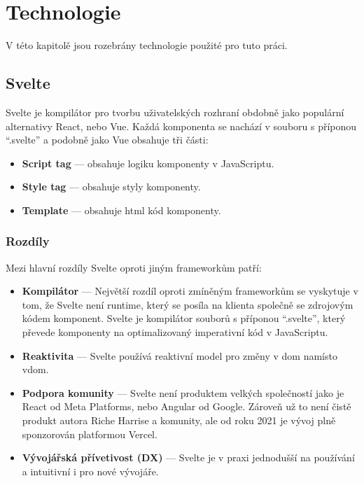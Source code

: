 \chapter{Technologie}

V této kapitolě jsou rozebrány technologie použité pro tuto práci.

\section{Svelte}\label{sec:Svelte}

Svelte je kompilátor pro tvorbu uživatelských rozhraní obdobně jako populární alternativy React, nebo Vue.
Každá komponenta se nachází v souboru s příponou ``.svelte'' a podobně jako Vue obsahuje tři části:

\begin{itemize}
    \item \textbf{Script tag} --- obsahuje logiku komponenty v JavaScriptu.
    \item \textbf{Style tag} --- obsahuje styly komponenty.
    \item \textbf{Template} --- obsahuje html kód komponenty.
\end{itemize}

\subsection{Rozdíly}

Mezi hlavní rozdíly Svelte oproti jiným frameworkům patří:

\begin{itemize}
    \item \textbf{Kompilátor} --- Největší rozdíl oproti zmíněným frameworkům se vyskytuje v tom, že Svelte není runtime, který se posíla na klienta společně se zdrojovým kódem komponent.
          Svelte je kompilátor souborů s příponou ``.svelte'', který převede komponenty na optimalizovaný imperativní kód v JavaScriptu.
    \item \textbf{Reaktivita} --- Svelte používá reaktivní model pro změny v \gls{dom} namísto \gls{vdom}.
    \item \textbf{Podpora komunity} --- Svelte není produktem velkých společností jako je React od Meta Platforms, nebo Angular od Google.
          Zároveň už to není čistě produkt autora Riche Harrise a komunity, ale od roku 2021 je vývoj plně sponzorován platformou Vercel.
    \item \textbf{Vývojářská přívetivost (DX)} --- Svelte je v praxi jednodušší na používání a intuitivní i pro nové vývojáře.
\end{itemize}


